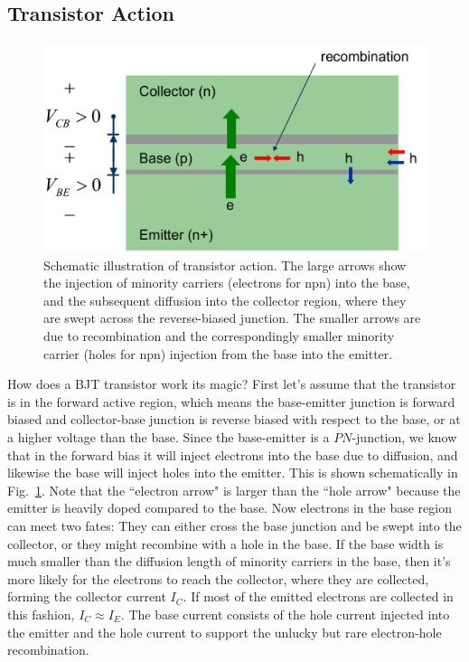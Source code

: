 \subsection{Transistor Action}
\begin{figure}[tb]
\centering
\includegraphics[width=.65\columnwidth]{slide9_bjt_action}
\caption{Schematic illustration of transistor action.  The large arrows show the injection of minority carriers (electrons for npn) into the base, and the subsequent diffusion into the collector region, where they are swept across the reverse-biased junction.  The smaller arrows are due to recombination and the correspondingly smaller minority carrier (holes for npn) injection from the base into the emitter.}
\label{fig:slide9_bjt_action}
\end{figure}
How does a BJT transistor work its magic?   First let's assume that the transistor is in the forward active region, which means the base-emitter junction is forward biased and collector-base junction is reverse biased with respect to the base, or at a higher voltage than the base.  
Since the base-emitter is a $PN$-junction, we know that in the forward bias it will inject electrons into the base due to diffusion, and likewise the base will inject holes into the emitter.  This is shown schematically in Fig.~\ref{fig:slide9_bjt_action}.  Note that the ``electron arrow" is larger than the ``hole arrow" because the emitter is heavily doped compared to the base.  Now electrons in the base region can meet two fates:  They can either cross the base junction and be swept into the collector, or they might recombine with a hole in the base.  If the base width is much smaller than the diffusion length of minority carriers in the base, then it's more likely for the electrons to reach the collector, where they are collected, forming the collector current $I_C$.  If most of the emitted electrons are collected in this fashion, $I_C \approx I_E$.  
The base current consists of the hole current injected into the emitter and the hole current to support the unlucky but rare electron-hole recombination.  
